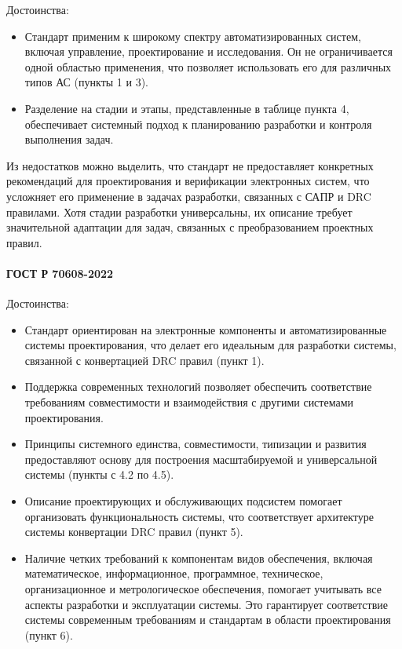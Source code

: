 Достоинства:

\begin{itemize}
	\item Стандарт применим к широкому спектру автоматизированных систем,
		включая управление, проектирование и исследования.
		Он не ограничивается одной областью применения,
		что позволяет использовать его для различных типов АС (пункты 1 и 3).
	\item Разделение на стадии и этапы, представленные в таблице пункта 4,
		обеспечивает системный подход к планированию разработки
		и контроля выполнения задач.
\end{itemize}

Из недостатков можно выделить,
что стандарт не предоставляет конкретных рекомендаций для проектирования
и верификации электронных систем,
что усложняет его применение в задачах разработки,
связанных с САПР и DRC правилами.
Хотя стадии разработки универсальны,
их описание требует значительной адаптации для задач,
связанных с преобразованием проектных правил.

\paragraph{ГОСТ Р 70608-2022}

Достоинства:

\begin{itemize}
	\item Стандарт ориентирован на электронные компоненты
		и автоматизированные системы проектирования,
		что делает его идеальным для разработки системы,
		связанной с конвертацией DRC правил (пункт 1).
	\item Поддержка современных технологий позволяет обеспечить
		соответствие требованиям совместимости
		и взаимодействия с другими системами проектирования.
	\item Принципы системного единства, совместимости, типизации
		и развития предоставляют основу для построения масштабируемой
		и универсальной системы (пункты с 4.2 по 4.5).
	\item Описание проектирующих
		и обслуживающих подсистем помогает организовать
		функциональность системы, что соответствует архитектуре
		системы конвертации DRC правил (пункт 5).
	\item Наличие четких требований к компонентам видов обеспечения,
		включая математическое, информационное, программное, техническое,
		организационное и метрологическое обеспечения,
		помогает учитывать все аспекты разработки и эксплуатации системы.
		Это гарантирует соответствие системы современным требованиям
		и стандартам в области проектирования (пункт 6).
\end{itemize}

